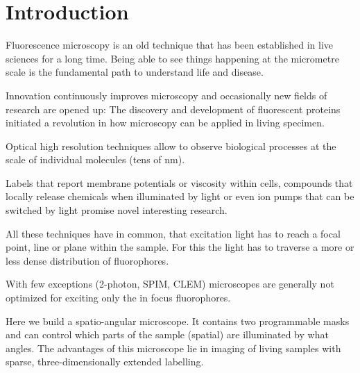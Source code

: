 \chapter{Introduction}
Fluorescence microscopy is an old technique that has been established
in live sciences for a long time. Being able to see things happening
at the micrometre scale is the fundamental path to understand life and
disease.

Innovation continuously improves microscopy and occasionally new
fields of research are opened up: The discovery and development of
fluorescent proteins initiated a revolution in how microscopy can be
applied in living specimen. 

Optical high resolution techniques allow
to observe biological processes at the scale of individual molecules
(tens of nm). 

Labels that report membrane potentials or viscosity within cells,
compounds that locally release chemicals when illuminated by light or
even ion pumps that can be switched by light promise novel interesting
research.

All these techniques have in common, that excitation light has to
reach a focal point, line or plane within the sample. For this the
light has to traverse a more or less dense distribution of
fluorophores.

With few exceptions (2-photon, SPIM, CLEM) microscopes are generally
not optimized for exciting only the in focus fluorophores.

Here we build a spatio-angular microscope. It contains two
programmable masks and can control which parts of the sample (spatial)
are illuminated by what angles. The advantages of this microscope lie
in imaging of living samples with sparse, three-dimensionally
extended labelling.